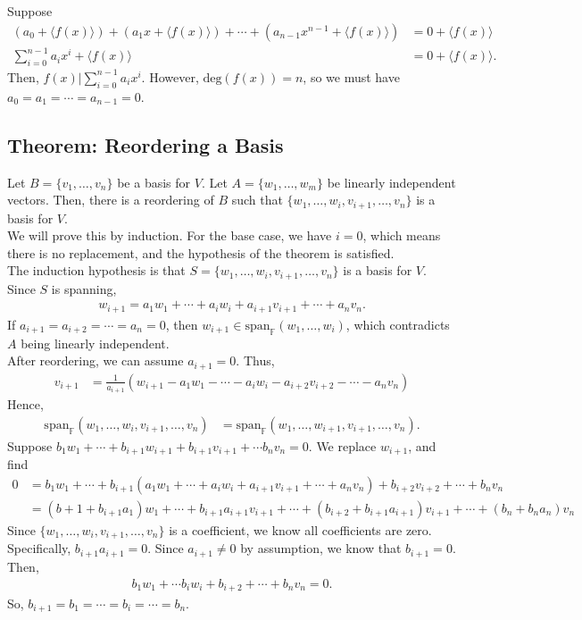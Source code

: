 \documentclass[10pt]{extarticle}
\begin{document}
  Suppose
  \begin{align*}
    (a_0 + \langle f(x)\rangle) + (a_1x + \langle f(x) \rangle) + \cdots + (a_{n-1}x^{n-1} + \langle f(x) \rangle) &= 0 + \langle f(x) \rangle\\
    \sum_{i=0}^{n-1}a_ix^i + \langle f(x) \rangle &= 0 + \langle f(x) \rangle.
  \end{align*}
  Then, $f(x) | \sum_{i=0}^{n-1} a_ix^{i}$. However, $\text{deg}(f(x)) = n$, so we must have $a_0 = a_1 = \cdots = a_{n-1} = 0$.
  \subsection{Theorem: Reordering a Basis}%
  Let $B = \{v_1,\dots,v_n\}$ be a basis for $V$. Let $A = \{w_1,\dots,w_m\}$ be linearly independent vectors. Then, there is a reordering of $B$ such that $\{w_1,\dots,w_i,v_{i+1},\dots,v_n\}$ is a basis for $V$.\\

  We will prove this by induction. For the base case, we have $i=0$, which means there is no replacement, and the hypothesis of the theorem is satisfied.\\

  The induction hypothesis is that $S = \{w_1,\dots,w_i,v_{i+1},\dots,v_n\}$ is a basis for $V$. Since $S$ is spanning,
  \begin{align*}
    w_{i+1} = a_1w_1 + \cdots + a_iw_i + a_{i+1}v_{i+1} + \cdots + a_{n}v_n.
  \end{align*}
  If $a_{i+1} = a_{i+2} = \cdots = a_n = 0$, then $w_{i+1} \in \text{span}_{\mathbb{F}}(w_1,\dots,w_i)$, which contradicts $A$ being linearly independent.\\

  After reordering, we can assume $a_{i+1} = 0$. Thus,
  \begin{align*}
    v_{i+1} &= \frac{1}{a_{i+1}}\left(w_{i+1} - a_1w_1 - \cdots - a_iw_i - a_{i+2}v_{i+2} - \cdots - a_nv_n\right) \tag*{(\textasteriskcentered)}
  \end{align*}
  Hence,
  \begin{align*}
    \text{span}_{\mathbb{F}}\left(w_1,\dots,w_i,v_{i+1},\dots,v_n\right) &= \text{span}_{\mathbb{F}}\left(w_1,\dots,w_{i+1},v_{i+1},\dots,v_n\right).
  \end{align*}
  Suppose $b_1w_1 + \cdots + b_{i+1}w_{i+1} + b_{i+1}v_{i+1} + \cdots b_nv_n  = 0$. We replace $w_{i+1}$, and find
  \begin{align*}
    0 &= b_1w_1 + \cdots + b_{i+1}\left(a_1w_1 + \cdots + a_iw_i + a_{i+1}v_{i+1} + \cdots + a_nv_n\right) + b_{i+2}v_{i+2} + \cdots + b_nv_n\\
      &= (b+1 + b_{i+1}a_1)w_1 + \cdots + b_{i+1}a_{i+1}v_{i+1} + \cdots + (b_{i+2} + b_{i+1}a_{i+1})v_{i+1} + \cdots + (b_n + b_na_n)v_n
  \end{align*}
  Since $\{w_1,\dots,w_i,v_{i+1},\dots,v_n\}$ is a coefficient, we know all coefficients are zero. Specifically, $b_{i+1}a_{i+1} = 0$. Since $a_{i+1} \neq 0$ by assumption, we know that $b_{i+1} = 0$. Then,
  \begin{align*}
    b_{1}w_1 + \cdots b_iw_i + b_{i+2} + \cdots + b_{n}v_n = 0.
  \end{align*}
  So, $b_{i+1} = b_1 = \cdots = b_i = \cdots = b_n$.
\end{document}
